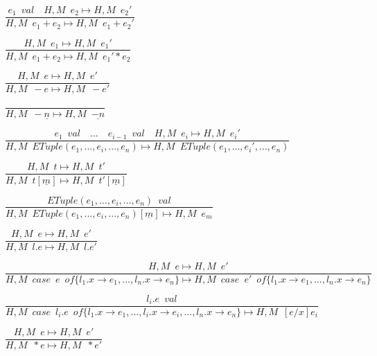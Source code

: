 \documentclass{article}
\begin{document}
\centerline{$\dfrac{e_1 \enspace val \quad H, M \enspace e_2  \longmapsto H, M \enspace e_2'}{H, M \enspace e_1 + e_2 \longmapsto H, M \enspace e_1 + e_2'}$}\vspace{5pt}

\centerline{$\dfrac{H, M \enspace e_1 \longmapsto H, M \enspace e_1'}{H, M \enspace e_1 + e_2 \longmapsto H, M \enspace e_1' * e_2}$}\vspace{5pt}

\centerline{$\dfrac{H, M \enspace e \longmapsto H, M \enspace e'}{H, M \enspace -e \longmapsto H, M \enspace -e'}$}\vspace{5pt}

\centerline{$\dfrac{}{H, M \enspace -\underline{n} \longmapsto H, M \enspace \underline{-n}}$}\vspace{5pt}

\centerline{$\dfrac{e_1 \enspace val \quad ... \quad e_{i-1} \enspace val \quad H, M \enspace e_i \longmapsto H, M \enspace e_i' }{H, M \enspace ETuple(e_1, ..., e_i, ..., e_n) \longmapsto H, M \enspace ETuple(e_1, ..., e_i', ..., e_n)}$}\vspace{5pt}

\centerline{$\dfrac{H, M \enspace t \longmapsto H, M \enspace t'}{H, M \enspace t[\underline{m}] \longmapsto H, M \enspace t'[\underline{m}]}$}\vspace{5pt}

\centerline{$\dfrac{ETuple(e_1, ..., e_i, ..., e_n) \enspace val}{H, M \enspace ETuple(e_1, ..., e_i, ..., e_n)[\underline{m}] \longmapsto H, M \enspace e_m}$}\vspace{5pt}

\centerline{$\dfrac{H, M \enspace e \longmapsto H, M \enspace e'}{H, M \enspace l.e \longmapsto H, M \enspace l.e' }$}\vspace{5pt}

\centerline{$\dfrac{H, M \enspace e \mapsto H, M \enspace e'}{H, M \enspace case \enspace e \enspace of \{ l_1.x \rightarrow e_1, ...,  l_n.x \rightarrow e_n\} \longmapsto H, M \enspace case \enspace e' \enspace of \{ l_1.x \rightarrow e_1, ...,  l_n.x \rightarrow e_n\} }$}\vspace{5pt}

\centerline{$\dfrac{l_i.e \enspace val}{H, M \enspace case \enspace l_i.e \enspace of \{ l_1.x \rightarrow e_1, ..., l_i.x \rightarrow e_i, ...,  l_n.x \rightarrow e_n\} \longmapsto H, M \enspace [e / x]e_i }$}\vspace{5pt}

\centerline{$\dfrac{H, M \enspace e \longmapsto H, M \enspace e'}{H, M \enspace *e \longmapsto H, M \enspace *e'}$}\vspace{5pt}
\end{document}
